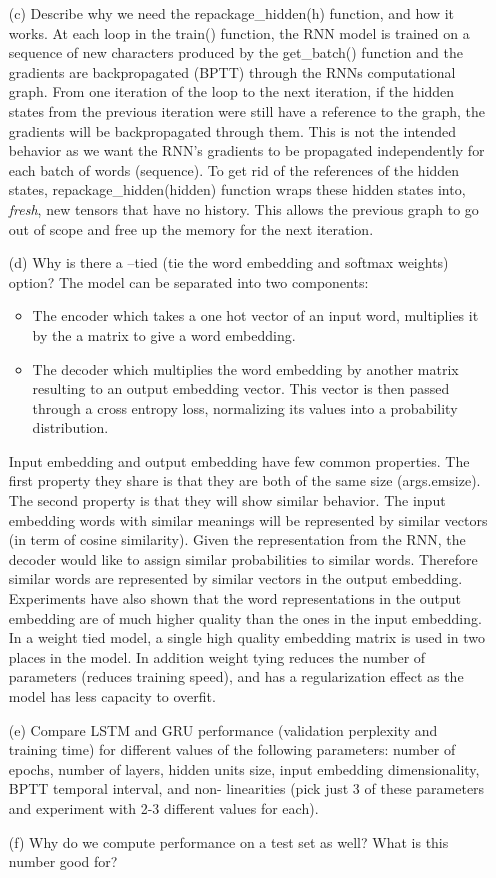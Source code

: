 \documentclass[11pt]{article}
\newcommand{\0}{\mat{0}}
\begin{document}
\begin{itemize}
    \item[(c)]      
    Describe why we need the repackage\_hidden(h) function, and how it works.
 At each loop in the train() function, the RNN model is trained on a sequence of new characters produced by the  get\_batch() function and the gradients are backpropagated (BPTT) through the RNNs computational graph. From one iteration of the loop to the next iteration, if the hidden states from the previous iteration were still have a reference to the graph, the gradients will be backpropagated through them. This is not the intended behavior as we want the RNN's gradients to be propagated independently for each batch of words (sequence). To get rid of the references of the hidden states, repackage\_hidden(hidden) function  wraps these hidden states into, \textit{fresh}, new tensors that have no history. This allows the previous graph to go out of scope and free up the memory for the next iteration.
    
     \item[(d)] 
    Why is there a --tied (tie the word embedding and softmax weights) option?
    The model can be separated into two components:
    \begin{itemize}
     \item The encoder which takes a one hot vector of an input word, multiplies it by the a matrix to give a word embedding. 
     \item The decoder which multiplies the word embedding by another matrix resulting to an output embedding vector. This vector is then passed through a cross entropy loss, normalizing its values into a probability distribution.
    \end{itemize}
    Input embedding and output embedding have few common properties. The first property they share is that they are both of the same size (args.emsize). The second property is that they will show similar behavior.
    The input embedding words with similar meanings will be represented by similar vectors (in term of cosine similarity). Given the representation from the RNN, the decoder would like to assign similar probabilities to similar words.
    Therefore similar words are represented by similar vectors in the output embedding. Experiments have also shown that the word representations in the output embedding are of much higher quality than the ones in the input
    embedding. In a weight tied model, a single high quality embedding matrix is used in two places in the model. In addition weight tying reduces the number of parameters (reduces training speed), and has a regularization effect
    as the model has less capacity to overfit.       
     \item[(e)] 
     Compare LSTM and GRU performance (validation perplexity and training time) for different values of the following parameters: number of epochs, number of layers, hidden units size, input embedding dimensionality, BPTT temporal interval, and non- linearities (pick just 3 of these parameters and experiment with 2-3 different values for each).
     \item[(f)] Why do we compute performance on a test set as well? What is this number good for?
 \end{itemize}   
 
\end{document}
